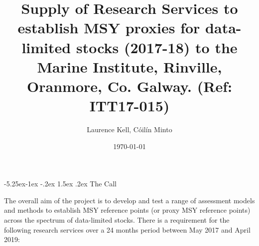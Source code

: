 \documentclass[a4paper, 10pt]{article}
\title{Supply of Research Services to establish MSY proxies for data-limited stocks (2017-18) to the Marine Institute, Rinville, Oranmore, Co. Galway.
(Ref: ITT17-015)}
\author{Laurence Kell, C\'oil\'in Minto}
\date{\today}
\makeatletter
\renewcommand{\section}{\@startsection{section}{1}{\z@}%
  {-5.25ex\@plus -1ex \@minus -.2ex}%
  {1.5ex \@plus .2ex}%
  {\normalfont\bfseries}}
\makeatother
\begin{document}


\onehalfspacing
{}
\rhead{}

\maketitle
\thispagestyle{fancy}
\pagestyle{empty}

%
\begin{abstract}

\textit{}


\end{abstract}

\tableofcontents
\newpage

\onehalfspacing
{}
\rhead{}

\maketitle
\thispagestyle{fancy}
\pagestyle{empty}


\maketitle

\newpage\section{The Call}

The overall aim of the project is to develop and test a range of assessment models and methods to establish MSY reference points (or proxy MSY reference points) across the spectrum of data-limited stocks. There is a requirement for the following research services over a 24 months period between May 2017 and April 2019: 
\end{document}
